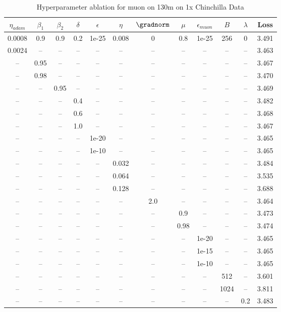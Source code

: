 \begin{table}[h!]
\centering
\caption{Hyperparameter ablation for muon on 130m on 1x Chinchilla Data}
\label{tab:ablation_muon_130m_on_1x_chinchilla_data}
\begin{tabular}{cccccccccccc}
\toprule
$\eta_{adam}$ & $\beta_1$ & $\beta_2$ & $\delta$ & $\epsilon$ & $\eta$ & $\gradnorm$ & $\mu$ & $\epsilon_{muon}$ & $B$ & $\lambda$ & Loss \\
\midrule
0.0008 & 0.9 & 0.9 & 0.2 & 1e-25 & 0.008 & 0 & 0.8 & 1e-25 & 256 & 0 & 3.491 \\
\midrule
0.0024 & -- & -- & -- & -- & -- & -- & -- & -- & -- & -- & 3.463 \\
-- & 0.95 & -- & -- & -- & -- & -- & -- & -- & -- & -- & 3.467 \\
-- & 0.98 & -- & -- & -- & -- & -- & -- & -- & -- & -- & 3.470 \\
-- & -- & 0.95 & -- & -- & -- & -- & -- & -- & -- & -- & 3.469 \\
-- & -- & -- & 0.4 & -- & -- & -- & -- & -- & -- & -- & 3.482 \\
-- & -- & -- & 0.6 & -- & -- & -- & -- & -- & -- & -- & 3.468 \\
-- & -- & -- & 1.0 & -- & -- & -- & -- & -- & -- & -- & 3.467 \\
-- & -- & -- & -- & 1e-20 & -- & -- & -- & -- & -- & -- & 3.465 \\
-- & -- & -- & -- & 1e-10 & -- & -- & -- & -- & -- & -- & 3.465 \\
-- & -- & -- & -- & -- & 0.032 & -- & -- & -- & -- & -- & 3.484 \\
-- & -- & -- & -- & -- & 0.064 & -- & -- & -- & -- & -- & 3.535 \\
-- & -- & -- & -- & -- & 0.128 & -- & -- & -- & -- & -- & 3.688 \\
-- & -- & -- & -- & -- & -- & 2.0 & -- & -- & -- & -- & 3.464 \\
-- & -- & -- & -- & -- & -- & -- & 0.9 & -- & -- & -- & 3.473 \\
-- & -- & -- & -- & -- & -- & -- & 0.98 & -- & -- & -- & 3.474 \\
-- & -- & -- & -- & -- & -- & -- & -- & 1e-20 & -- & -- & 3.465 \\
-- & -- & -- & -- & -- & -- & -- & -- & 1e-15 & -- & -- & 3.465 \\
-- & -- & -- & -- & -- & -- & -- & -- & 1e-10 & -- & -- & 3.465 \\
-- & -- & -- & -- & -- & -- & -- & -- & -- & 512 & -- & 3.601 \\
-- & -- & -- & -- & -- & -- & -- & -- & -- & 1024 & -- & 3.811 \\
-- & -- & -- & -- & -- & -- & -- & -- & -- & -- & 0.2 & 3.483 \\
\bottomrule
\end{tabular}
\end{table}

